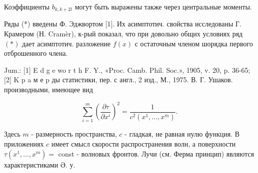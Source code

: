 \documentclass[10pt]{article}
\begin{document}
Коэффициенты $b_{k, k+2 l}$ могут быть выражены также через центральные моменты.



Ряды (*) введены Ф. Эджвортом [1]. Их асимптотич. свойства исследованы Г. Крамером (Н. Cramèr), к-рый показал, что при довольно общих условиях ряд $(*)$ дает асимптотич. разложение $f(x)$ с остаточным членом шорядка первого отброшенного члена.



Jum.: [1] E d g e wo r t h F. Y., «Proc. Camb. Phil. Soc.», 1905, v. 20, p. 36-65; [2] K p a м е p ды статистики, пер. с англ., 2 изд., М., 1975. В. Г. Ушаков. производными, имеющее вид



\[

\sum_{i=1}^{m}\left(\frac{\partial \tau}{\partial x^{i}}\right)^{2}=\frac{1}{c^{2}\left(x^{1}, \ldots, x^{m}\right)} .

\]



Здесь $m$ - размерность пространства, $c$ - гладкая, не равная нулю функция. В приложениях $c$ имеет смысл скорости распространения волн, а поверхности $\tau\left(x^{1}, \ldots, x^{m}\right)=$ const - волновых фронтов. Лучи (см. Ферма принцип) являются характеристиками Ә. у.
\end{document}
